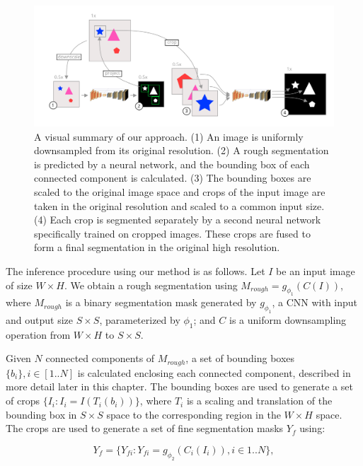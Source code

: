 \begin{figure}[H]
\centering
\includegraphics[width=\textwidth]{images/5/explainer-diagram.png}
\caption{A visual summary of our approach. (1) An image is uniformly downsampled from its original resolution. (2) A rough segmentation is predicted by a neural network, and the bounding box of each connected component is calculated. (3) The bounding boxes are scaled to the original image space and crops of the input image are taken in the original resolution and scaled to a common input size. (4) Each crop is segmented separately by a second neural network specifically trained on cropped images. These crops are fused to form a final segmentation in the original high resolution. \cite{bencevicSegmentthenSegmentContextPreservingCropBased2023a}\label{fig:summary}}
\end{figure}

The inference procedure using our method is as follows. Let $I$ be an input image of size $W \times H$. We obtain a rough segmentation using $M_{rough} = g_{\phi_1}(C(I))$, where $M_{rough}$ is a binary segmentation mask generated by $g_{\phi_1}$, a CNN with input and output size $S \times S$, parameterized by $\phi_1$; and $C$ is a uniform downsampling operation from  $W \times H$ to $S \times S$. 

Given $N$ connected components of $M_{rough}$, a set of bounding boxes $\{b_i\}, i \in [1..N]$ is calculated enclosing each connected component, described in more detail later in this chapter. The bounding boxes are used to generate a set of crops $\{I_i: I_i = I(T_i(b_i))\}$, where $T_i$ is a scaling and translation of the bounding box in $S \times S$ space to the corresponding region in the $W \times H$ space.
The crops are used to generate a set of fine segmentation masks $Y_f$ using:

\begin{equation}
Y_f = \{Y_{fi}: Y_{fi} = g_{\phi_2}(C_i(I_i)), i \in 1..N\},
\end{equation}

